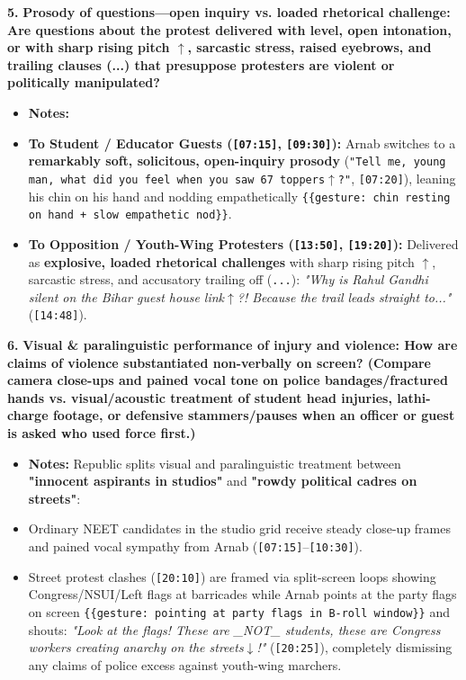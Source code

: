 \documentclass[10pt,a4paper]{article}
\begin{document}
\noindent\textbf{5.} \textbf{Prosody of questions---open inquiry vs. loaded rhetorical challenge: Are questions about the protest delivered with level, open intonation, or with sharp rising pitch $\uparrow$, sarcastic stress, raised eyebrows, and trailing clauses (...) that presuppose protesters are violent or politically manipulated?}\par\smallskip
\begin{itemize}
  \item \textbf{Notes:}
  \item \textbf{To Student / Educator Guests (\texttt{[07:15]}, \texttt{[09:30]}):} Arnab switches to a \textbf{remarkably soft, solicitous, open-inquiry prosody} (\texttt{"Tell me, young man, what did you feel when you saw 67 toppers$\uparrow$?"}, \texttt{[07:20]}), leaning his chin on his hand and nodding empathetically \texttt{\{\{gesture: chin resting on hand + slow empathetic nod\}\}}.
  \item \textbf{To Opposition / Youth-Wing Protesters (\texttt{[13:50]}, \texttt{[19:20]}):} Delivered as \textbf{explosive, loaded rhetorical challenges} with sharp rising pitch \texttt{$\uparrow$}, sarcastic stress, and accusatory trailing off (\texttt{...}): \textit{"Why is Rahul Gandhi silent on the Bihar guest house link$\uparrow$?! Because the trail leads straight to..."} (\texttt{[14:48]}).
\end{itemize}

\noindent\textbf{6.} \textbf{Visual \& paralinguistic performance of injury and violence: How are claims of violence substantiated non-verbally on screen? (Compare camera close-ups and pained vocal tone on police bandages/fractured hands vs. visual/acoustic treatment of student head injuries, lathi-charge footage, or defensive stammers/pauses when an officer or guest is asked who used force first.)}\par\smallskip
\begin{itemize}
  \item \textbf{Notes:}
Republic splits visual and paralinguistic treatment between \textbf{"innocent aspirants in studios"} and \textbf{"rowdy political cadres on streets"}:\par\smallskip
  \item Ordinary NEET candidates in the studio grid receive steady close-up frames and pained vocal sympathy from Arnab (\texttt{[07:15]}--\texttt{[10:30]}).
  \item Street protest clashes (\texttt{[20:10]}) are framed via split-screen loops showing Congress/NSUI/Left flags at barricades while Arnab points at the party flags on screen \texttt{\{\{gesture: pointing at party flags in B-roll window\}\}} and shouts: \textit{"Look at the flags! These are \_NOT\_ students, these are Congress workers creating anarchy on the streets$\downarrow$!"} (\texttt{[20:25]}), completely dismissing any claims of police excess against youth-wing marchers.
\end{itemize}
\end{document}
